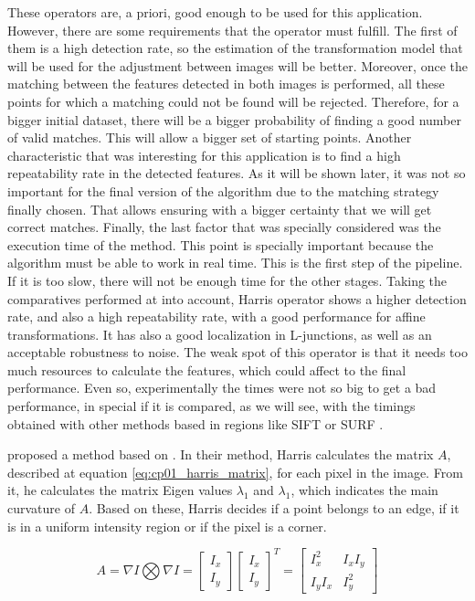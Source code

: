 These operators are, a priori, good enough to be used for this application. However, there are some requirements that the operator must fulfill. The first of them is a high detection rate, so the estimation of the transformation model that will be used for the adjustment between images will be better. Moreover, once the matching between the features detected in both images is performed, all these points for which a matching could not be found will be rejected. Therefore, for a bigger initial dataset, there will be a bigger probability of finding a good number of valid matches. This will allow a bigger set of starting points. Another characteristic that was interesting for this application is to find a high repeatability rate in the detected features. As it will be shown later, it was not so important for the final version of the algorithm due to the matching strategy finally chosen. That allows ensuring with a bigger certainty that we will get correct matches. Finally, the last factor that was specially considered was the execution time of the method. This point is specially important because the algorithm must be able to work in real time. This is the first step of the pipeline. If it is too slow, there will not be enough time for the other stages. Taking the comparatives performed at \cite{mohanna2001performance, zheng1999analysis} into account, Harris operator shows a higher detection rate, and also a high repeatability rate, with a good performance for affine transformations. It has also a good localization in L-junctions, as well as an acceptable robustness to noise. The weak spot of this operator is that it needs too much resources to calculate the features, which could affect to the final performance. Even so, experimentally the times were not so big to get a bad performance, in special if it is compared, as we will see, with the timings obtained with other methods based in regions like SIFT \citep{lowe1999object} or SURF \citep{bay2008speeded}.

\cite{shi1994good} proposed a method based on \cite{harris1988combined}. In their method, Harris calculates the matrix $A$, described at equation \ref{eq:cp01_harris_matrix}, for each pixel in the image. From it, he calculates the matrix Eigen values $\lambda_1$ and $\lambda_1$, which indicates the main curvature of $A$. Based on these, Harris decides if a point belongs to an edge, if it is in a uniform intensity region or if the pixel is a corner.

\begin{equation}\label{eq:cp01_harris_matrix}
A = \nabla I \bigotimes \nabla I = 
\left [ \begin{array}{c} I_x \\ I_y \end{array} \right ]
\left [ \begin{array}{c} I_x \\ I_y \end{array} \right ]^T = 
\left [ \begin{array}{cc} 
I_x^2 & I_xI_y \\ 
I_yI_x & I_y^2
\end{array} \right ]
\end{equation}

